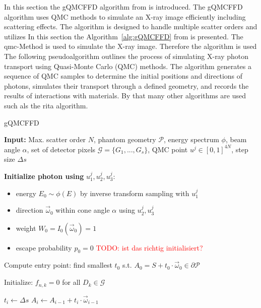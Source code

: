 In this section the gQMCFFD algorithm from \cite{qmcXray2023} is introduced. The gQMCFFD algorithm uses QMC methods to simulate an X-ray image efficiently including scattering effects. The algorithm is designed to handle multiple scatter orders and utilizes 
In this section the Algorithm~\ref{alg:gQMCFFD} from \cite{qmcXray2023} is presented. The \ac{qmc}-Method is used to simulate the X-ray image. Therefore the algorithm is used 
The following pseudoalgorithm outlines the process of simulating X-ray photon transport using Quasi-Monte Carlo (QMC) methods. The algorithm generates a sequence of QMC samples to determine the initial positions and directions of photons, simulates their transport through a defined geometry, and records the results of interactions with materials. By that many other algorithms are used such als the \ac{rita} algorithm.
\begin{algorithm}{gQMCFFD}
\caption{gQMCFFD: X-ray Scatter Simulation (Part 1)}
\label{alg:gQMCFFD}
\begin{algorithmic}[1]
\State \textbf{Input:} Max. scatter order $N$, phantom geometry $\mathcal{P}$, energy spectrum $\phi$, beam angle $\alpha$, set of detector pixels $\mathcal{G}=\{G_1, ..., G_s\}$, QMC point $u^j \in [0,1]^{4N}$, step size $\Delta s$
\vspace{.25cm}

\State \textbf{Initialize photon using } $u^j_1, u^j_2, u^j_3$:
\begin{itemize}
    \item energy $E_0 \sim \phi(E)$ by inverse transform sampling with $u^j_1$
    \item direction $\vec{\omega}_0$ within cone angle $\alpha$ using $u^j_2, u^j_3$
    \item weight $W_0 = I_0(\vec{\omega}_0) = 1$
    \item escape probability $p_0 = 0$ \textcolor{red}{TODO: ist das richtig initialisiert?}
    \end{itemize}
    \State Compute entry point: find smallest $t_0$ s.t. $A_0 = S + t_0 \cdot \vec{\omega}_0 \in \partial\mathcal{P}$

\vspace{.25cm}
\State Initialize: $f_{n,k} = 0$ for all $D_k \in \mathcal{G}$

 \State $t_i\gets\Delta s$ 
    \State$A_i \gets A_{i-1} + t_i \cdot \vec{\omega}_{i-1}$  
    

\end{algorithmic}
\end{algorithm}
